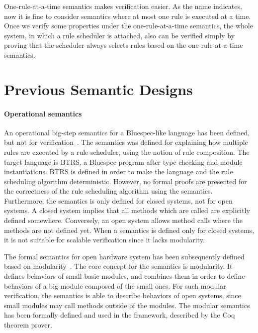 One-rule-at-a-time semantics makes verification easier. As the name
indicates, now it is fine to consider semantics where at most one rule
is executed at a time. Once we verify some properties under the
one-rule-at-a-time semantics, the whole system, in which a rule
scheduler is attached, also can be verified simply by proving that the
scheduler always selects rules based on the one-rule-at-a-time
semantics.

\section{Previous Semantic Designs}
\label{sec:related-works}

\paragraph{Operational semantics}

An operational big-step semantics for a Bluespec-like language has
been defined, but not for verification~\cite{nirav-memocode}. The
semantics was defined for explaining how multiple rules are executed
by a rule scheduler, using the notion of rule composition. The target
language is BTRS, a Bluespec program after type checking and module
instantiations. BTRS is defined in order to make the language and the
rule scheduling algorithm deterministic. However, no formal proofs are
presented for the correctness of the rule scheduling algorithm using
the semantics. Furthermore, the semantics is only defined for closed
systems, not for open systems. A closed system implies that all
methods which are called are explicitly defined somewhere. Conversely,
an open system allows method calls where the methods are not defined
yet. When a semantics is defined only for closed systems, it is not
suitable for scalable verification since it lacks modularity.

The formal semantics for open hardware system has been subsequently
defined based on modularity~\cite{murali-thesis}. The core concept for
the semantics is modularity. It defines behaviors of small basic
modules, and combines them in order to define behaviors of a big
module composed of the small ones. For such modular verification, the
semantics is able to describe behaviors of open systems, since small
modules may call methods outside of the modules. The modular semantics
has been formally defined and used in the \Kami{} framework, described
by the Coq theorem prover.

